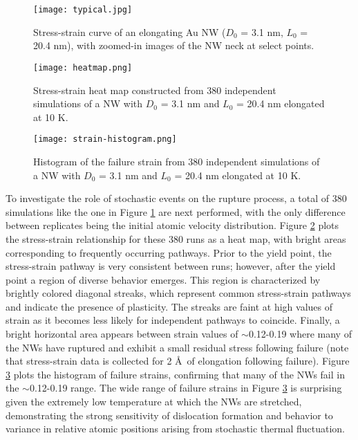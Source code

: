 \documentclass[10pt]{report}  %
\begin{document}
%
%
\begin{figure}[h!]
       \centering
	\texttt{[image: typical.jpg]}
	\caption{Stress-strain curve of an elongating Au NW ($D_{0}$ = 3.1 nm, $L_{0}$ = 20.4 nm), with zoomed-in images of the NW neck at select points.}
	\label{fig:typical}
\end{figure}

%
%
\begin{figure}[h!]
       \centering
	\texttt{[image: heatmap.png]}
	\caption{Stress-strain heat map constructed from 380 independent simulations of a NW with $D_{0}$ = 3.1 nm and $L_{0}$ = 20.4 nm elongated at 10 K. }
	\label{fig:heatmap}
\end{figure}

%
%
\begin{figure}[h!]
       \centering
	\texttt{[image: strain-histogram.png]}
	\caption{Histogram of the failure strain from 380 independent simulations of a NW with $D_{0}$ = 3.1 nm and $L_{0}$ = 20.4 nm elongated at 10 K. }
	\label{fig:failure-strain}
\end{figure}

To investigate the role of stochastic events on the rupture process, a total of 380 simulations like the one in Figure \ref{fig:typical} are next performed, with the only difference between replicates being the initial atomic velocity distribution. Figure \ref{fig:heatmap} plots the stress-strain relationship for these 380 runs as a heat map, with bright areas corresponding to frequently occurring pathways. Prior to the yield point, the stress-strain pathway is very consistent between runs; however, after the yield point a region of diverse behavior emerges. This region is characterized by brightly colored diagonal streaks, which represent common stress-strain pathways and indicate the presence of plasticity. The streaks are faint at high values of strain as it becomes less likely for independent pathways to coincide. Finally, a bright horizontal area appears between strain values of $\sim$0.12-0.19 where many of the NWs have ruptured and exhibit a small residual stress following failure (note that stress-strain data is collected for 2 \AA\ of elongation following failure). Figure \ref{fig:failure-strain} plots the histogram of failure strains, confirming that many of the NWs fail in the $\sim$0.12-0.19 range. The wide range of failure strains in Figure \ref{fig:failure-strain} is surprising given the extremely low temperature at which the NWs are stretched, demonstrating the strong sensitivity of dislocation formation and behavior to variance in relative atomic positions arising from stochastic thermal fluctuation. 
\end{document}
